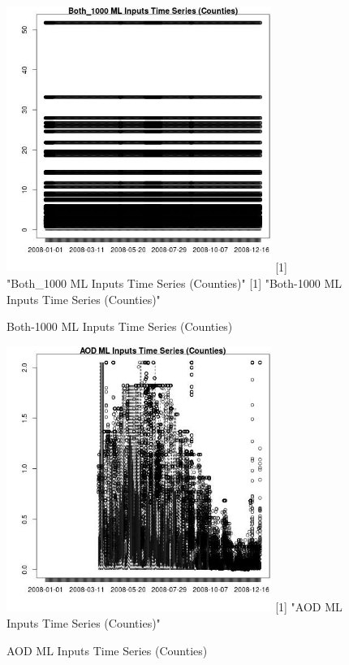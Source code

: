 \begin{figure} 
\centering  
\includegraphics[width=0.77\textwidth]{Code_Outputs/ML_input_report_ML_input_CountyGeometricCentroids_Locations_Dates_part_c_2008-01-01to2008-12-31_Both_1000TS.jpg} 
[1] "Both_1000 ML Inputs Time Series (Counties)"
[1] "Both-1000 ML Inputs Time Series (Counties)"
\caption{\label{fig:ML_input_report_ML_input_CountyGeometricCentroids_Locations_Dates_part_c_2008-01-01to2008-12-31Both_1000TS}Both-1000 ML Inputs Time Series (Counties)} 
\end{figure} 
 

\begin{figure} 
\centering  
\includegraphics[width=0.77\textwidth]{Code_Outputs/ML_input_report_ML_input_CountyGeometricCentroids_Locations_Dates_part_c_2008-01-01to2008-12-31_AODTS.jpg} 
[1] "AOD ML Inputs Time Series (Counties)"
\caption{\label{fig:ML_input_report_ML_input_CountyGeometricCentroids_Locations_Dates_part_c_2008-01-01to2008-12-31AODTS}AOD ML Inputs Time Series (Counties)} 
\end{figure} 
 

